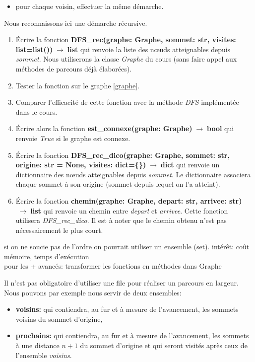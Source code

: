 \documentclass[a4paper,11pt]{article}
\begin{document}
\begin{Form}
\begin{exo}
\begin{itemize}
\begin{itemize}
\item pour chaque voisin, effectuer la même démarche.
\end{itemize}
\end{itemize}
Nous reconnaissons ici une démarche récursive.
\begin{enumerate}
\item Écrire la fonction \textbf{DFS\_rec(graphe: Graphe, sommet: str, visites: list=list())$\;\rightarrow\;$list} qui renvoie la liste des nœuds atteignables depuis \emph{sommet}. Nous utiliserons la classe \emph{Graphe} du cours (sans faire appel aux méthodes de parcours déjà élaborées).
\item Tester la fonction sur le graphe \ref{graphe}.
\item Comparer l'efficacité de cette fonction avec la méthode \emph{DFS} implémentée dans le cours.
\item Écrire alors la fonction \textbf{est\_connexe(graphe: Graphe)$\;\rightarrow\;$bool} qui renvoie \emph{True} si le graphe est connexe.
\item Écrire la fonction \textbf{DFS\_rec\_dico(graphe: Graphe, sommet: str, origine: str = None, visites: dict=\{\})$\;\rightarrow\;$dict} qui renvoie un dictionnaire des nœuds atteignables depuis \emph{sommet}. Le dictionnaire associera chaque sommet à son origine (sommet depuis lequel on l'a atteint).
\item Écrire la fonction \textbf{chemin(graphe: Graphe, depart: str, arrivee: str)$\;\rightarrow\;$list} qui renvoie un chemin entre \emph{depart} et \emph{arrivee}. Cette fonction utilisera \emph{DFS\_rec\_dico}. Il est à noter que le chemin obtenu n'est pas nécessairement le plus court.
\end{enumerate}
\begin{commentprof}
si on ne soucie pas de l'ordre on pourrait utiliser un ensemble (set). intérêt: coût mémoire, temps d'exécution\\
pour les + avancés: transformer les fonctions en méthodes dans Graphe
\end{commentprof}
\end{exo}
\begin{exo}
Il n'est pas obligatoire d'utiliser une file pour réaliser un parcours en largeur. Nous pouvons par exemple nous servir de deux ensembles:
\begin{itemize}
\item \textbf{voisins:} qui contiendra, au fur et à mesure de l'avancement, les sommets voisins du sommet d'origine,
\item \textbf{prochains:} qui contiendra, au fur et à mesure de l'avancement, les sommets à une distance $n+1$ du sommet d'origine et qui seront visités après ceux de l'ensemble \emph{voisins}.

\end{itemize}
\end{exo}
\end{Form}
\end{document}
